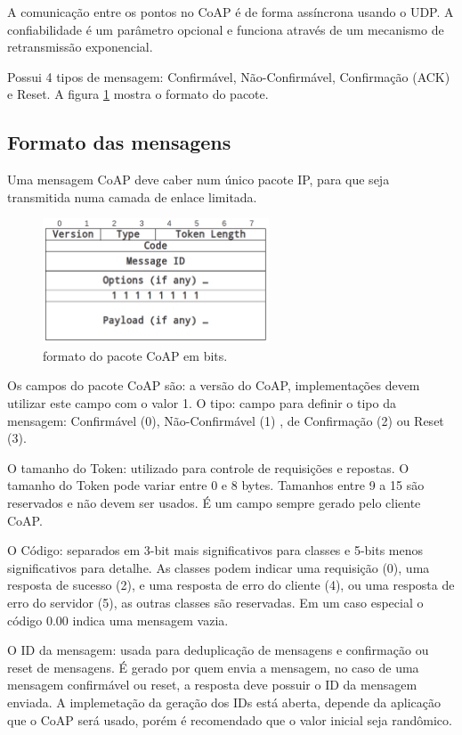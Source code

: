 A comunica\c{c}\~ao entre os pontos no CoAP \'e de forma ass\'incrona usando o UDP. A confiabilidade \'e um par\^ametro opcional e funciona atrav\'es de um mecanismo de retransmiss\~ao exponencial.

Possui 4 tipos de mensagem: Confirm\'avel, N\~ao-Confirm\'avel, Confirma\c{c}\~ao (ACK) e Reset. A figura \ref{coapFormat} mostra o formato do pacote.

\subsection{Formato das mensagens}
Uma mensagem CoAP deve caber num \'unico pacote IP, para que seja transmitida numa camada de enlace limitada.
\begin{figure}[h]
    \label{coapFormat}
    \centering
    \includegraphics[width=0.6\textwidth]{figuras/formato.png}
    \caption{formato do pacote CoAP  em bits. \cite{draft-ietf-core-coap-18}}
\end{figure}


Os campos do pacote CoAP s\~ao: a vers\~ao do CoAP, implementa\c{c}\~oes devem utilizar este campo com o valor 1. O tipo: campo para definir o tipo da mensagem: Confirm\'avel (0), N\~ao-Confirm\'avel (1) , de Confirma\c{c}\~ao (2) ou Reset (3).

O tamanho do Token: utilizado para controle de requisi\c{c}\~oes e repostas. O tamanho do Token pode variar entre 0 e 8 bytes. Tamanhos entre 9 a 15 s\~ao reservados e n\~ao devem ser usados. \'E um campo sempre gerado pelo cliente CoAP.

O C\'odigo: separados em 3-bit mais significativos para classes e 5-bits menos significativos para detalhe. As classes podem indicar uma requisi\c{c}\~ao (0), uma resposta de sucesso (2), e uma resposta de erro do cliente (4), ou uma resposta de erro do servidor (5), as outras classes s\~ao reservadas. Em um caso especial o c\'odigo 0.00 indica uma mensagem vazia.

O ID da mensagem: usada para deduplica\c{c}\~ao de mensagens e confirma\c{c}\~ao ou reset de mensagens. \'E gerado por quem envia a mensagem, no caso de uma mensagem confirm\'avel ou reset, a resposta deve possuir o ID da mensagem enviada. A implemeta\c{c}\~ao da gera\c{c}\~ao dos IDs est\'a aberta, depende da aplica\c{c}\~ao que o CoAP ser\'a usado, por\'em \'e recomendado que o valor inicial seja rand\^omico.
   
